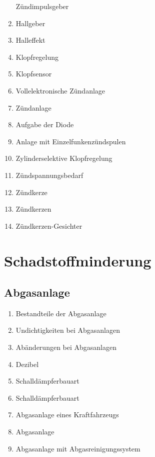\begin{enumerate}
  Zündimpulsgeber\\
\item
  Hallgeber\\
\item
  Halleffekt\\
\item
  Klopfregelung\\
\item
  Klopfsensor\\
\item
  Vollelektronische Zündanlage\\
\item
  Zündanlage\\
\item
  Aufgabe der Diode\\
\item
  Anlage mit Einzelfunkenzündspulen\\
\item
  Zylinderselektive Klopfregelung\\
\item
  Zündspannungsbedarf\\
\item
  Zündkerze\\
\item
  Zündkerzen\\
\item
  Zündkerzen-Gesichter
\end{enumerate}

\section{Schadstoffminderung}\label{schadstoffminderung}

\subsection{Abgasanlage}\label{abgasanlage}

\begin{enumerate}
\item
  Bestandteile der Abgasanlage\\
\item
  Undichtigkeiten bei Abgasanlagen\\
\item
  Abänderungen bei Abgasanlagen\\
\item
  Dezibel\\
\item
  Schalldämpferbauart\\
\item
  Schalldämpferbauart\\
\item
  Abgasanlage eines Kraftfahrzeugs\\
\item
  Abgasanlage\\
\item
  Abgasanlage mit Abgasreinigungssystem
\end{enumerate}

